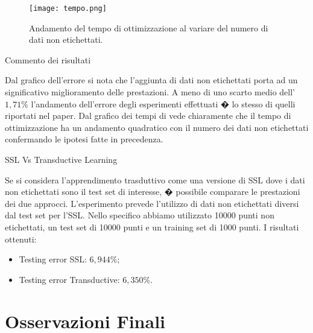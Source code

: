 \documentclass[mathserif]{beamer}
\begin{document}
\begin{frame}
\begin{figure}[htbp]
	\centering
		\texttt{[image: tempo.png]}
	\caption{Andamento del tempo di ottimizzazione al variare del numero di dati non etichettati.}
	\label{fig:gres}
\end{figure}
\end{frame}


\begin{frame}{Commento dei risultati}
\begin{block}{}
Dal grafico dell'errore si nota che l'\alert{aggiunta di dati non etichettati porta ad un significativo miglioramento delle prestazioni}. A meno di uno scarto medio dell' $1,71\%$ l'andamento dell'errore degli esperimenti effettuati � lo stesso di quelli riportati nel paper. Dal grafico dei tempi di vede chiaramente che il tempo di ottimizzazione ha un andamento \alert{quadratico} con il numero dei dati non etichettati confermando le ipotesi fatte in precedenza.
\end{block}
\end{frame}

\begin{frame}{SSL Vs Transductive Learning}
\begin{block}{}
Se si considera l'apprendimento trasduttivo come una versione di SSL dove i dati non etichettati sono il test set di interesse, � possibile comparare le prestazioni dei due approcci. L'esperimento prevede l'utilizzo di dati non etichettati diversi dal test set per l'SSL. Nello specifico abbiamo utilizzato 10000 punti non etichettati, un test set di 10000 punti e un training set di 1000 punti. I risultati ottenuti:
\begin{itemize}
	\item<1-> Testing error SSL: \alert{$6,944 \%$};
	\item<1-> Testing error Transductive: \alert{$6,350 \%$}.
\end{itemize}
\end{block}
\end{frame}

\section{Osservazioni Finali}
\end{document}
